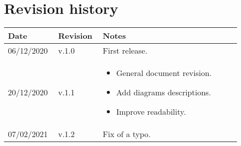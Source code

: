 \chapter*{Revision history}

\begin{center}
	\begin{tabular}{@{}p{0.18\linewidth} p{0.18\linewidth} p{0.57\linewidth}@{}}
		\toprule
		\textbf{Date} & \textbf{Revision} & \textbf{Notes}\\
		\midrule
		06/12/2020 & v.1.0 & First release.\\
		20/12/2020 & v.1.1 & \begin{itemize}[label={--},leftmargin=.4cm,noitemsep,topsep=0pt,before=\vspace{-3.5mm},after=\vspace{-4mm}]
			\item General document revision.
			\item Add diagrams descriptions.
			\item Improve readability.
		\end{itemize}\\
		07/02/2021 & v.1.2 & Fix of a typo.\\
		\bottomrule
	\end{tabular}
\end{center}
